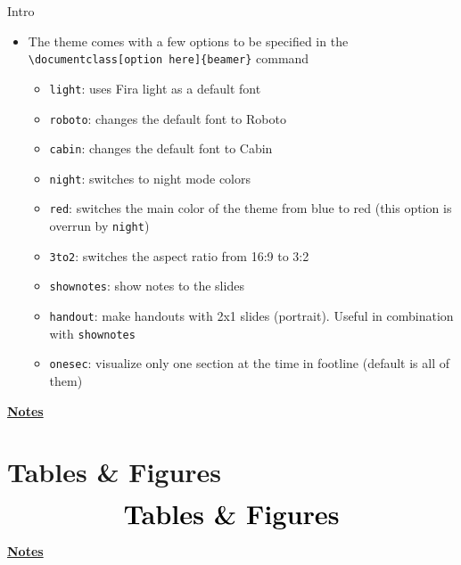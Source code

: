 \documentclass[10pt]{beamer}
\begin{document}
\begin{frame}
	{Intro}
	\begin{itemize}
		\item The theme comes with a few options to be specified in the \texttt{\textbackslash documentclass[option here]\{beamer\}} command \medskip
		\begin{itemize}
			\item \texttt{light}: uses Fira light as a default font\medskip
			\item \texttt{roboto}: changes the default font to Roboto\medskip
			\item \texttt{cabin}: changes the default font to Cabin\medskip
			\item \texttt{night}: switches to night mode colors \medskip
			\item \texttt{red}: switches the main color of the theme from blue to red (this option is overrun by \texttt{night})\medskip
			\item \texttt{3to2}: switches the aspect ratio from 16:9 to 3:2\medskip
			\item \texttt{shownotes}: show notes to the slides \medskip
			\item \texttt{handout}: make handouts with 2x1 slides (portrait). Useful in combination with \texttt{shownotes}\medskip
            \item \texttt{onesec}: visualize only one section at the time in footline (default is all of them)
		\end{itemize}
	\end{itemize}
\end{frame}
\begin{flushleft}
	\underline{\textbf{Notes}}\setlength{\parskip}{.15cm}\notesize\newline\par
\end{flushleft}


\section{Tables \& Figures}
\begin{frame}
	\begin{eqnarray*}
		&\text{{\huge \textbf{Tables \& Figures}}}\\
	\end{eqnarray*}
\end{frame}
\begin{flushleft}
	\underline{\textbf{Notes}}\setlength{\parskip}{.15cm}\notesize\newline\par
\end{flushleft}
\end{document}
